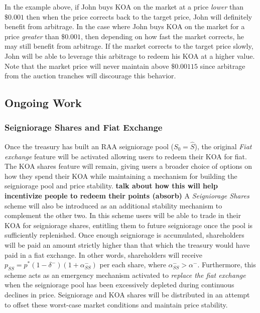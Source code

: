 In the example above, if John buys KOA on the market at a price \textit{lower} than $\$0.001$ then when the price corrects back to the target price, John will definitely benefit from arbitrage. In the case where John buys KOA on the market for a price \textit{greater} than $\$0.001$, then depending on how fast the market corrects, he may still benefit from arbitrage. If the market corrects to the target price slowly, John will be able to leverage this arbitrage to redeem his KOA at a higher value. Note that the market price will never maintain above $\$0.00115$ since arbitrage from the auction tranches will discourage this behavior. 


\subsection{Ongoing Work}

\subsubsection{Seigniorage Shares and Fiat Exchange}

Once the treasury has built an RAA seigniorage pool ($S_0 = \hat{S}$), the original \textit{Fiat exchange} feature will be activated allowing users to redeem their KOA for fiat. The KOA shares feature will remain, giving users a broader choice of options on how they spend their KOA while maintaining a mechanism for building the seigniorage pool and price stability. \textbf{talk about how this will help incentivize people to redeem their points (absorb)} A \textit{Seigniorage Shares} scheme will also be introduced as an additional stability mechanism to complement the other two. In this scheme users will be able to trade in their KOA for seigniorage shares, entitling them to future seigniorage once the pool is sufficiently replenished. Once enough seigniorage is accumulated, shareholders will be paid an amount strictly higher than that which the treasury would have paid in a fiat exchange. In other words, shareholders will receive $p_{SS} = p^*(1-\delta^-)(1+\alpha^-_{SS})$ per each share, where $\alpha^-_{SS} > \alpha^-$. Furthermore, this scheme acts as an emergency mechanism activated to \textit{replace the fiat exchange} when the seigniorage pool has been excessively depleted during continuous declines in price. Seigniorage and KOA shares will be distributed in an attempt to offset these worst-case market conditions and maintain price stability.

